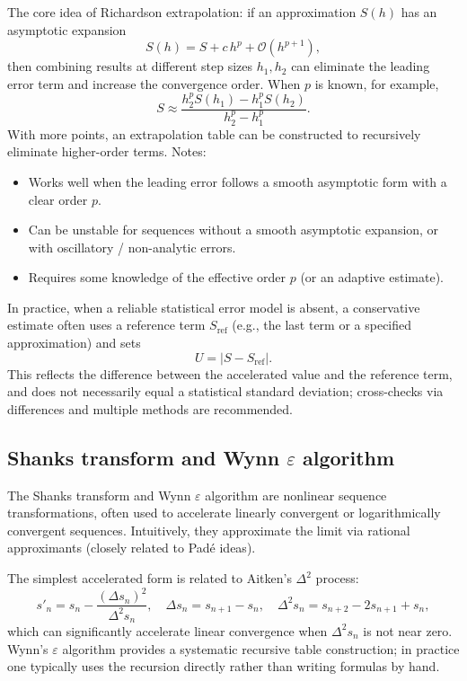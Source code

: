 \documentclass[a4paper,11pt]{article}
\begin{document}
The core idea of Richardson extrapolation: if an approximation $S(h)$ has an asymptotic expansion
\begin{equation}
S(h)=S + c\,h^p + \mathcal{O}(h^{p+1}),
\end{equation}
then combining results at different step sizes $h_1,h_2$ can eliminate the leading error term and increase the convergence order. When $p$ is known, for example,
\begin{equation}
S \approx \frac{h_2^p S(h_1) - h_1^p S(h_2)}{h_2^p - h_1^p}.
\end{equation}
With more points, an extrapolation table can be constructed to recursively eliminate higher-order terms. Notes:
\begin{itemize}
  \item Works well when the leading error follows a smooth asymptotic form with a clear order $p$.
  \item Can be unstable for sequences without a smooth asymptotic expansion, or with oscillatory / non-analytic errors.
  \item Requires some knowledge of the effective order $p$ (or an adaptive estimate).
\end{itemize}

In practice, when a reliable statistical error model is absent, a conservative estimate often uses a reference term $S_{\mathrm{ref}}$ (e.g., the last term or a specified approximation) and sets
\begin{equation}
U=|S-S_{\mathrm{ref}}|.
\end{equation}
This reflects the difference between the accelerated value and the reference term, and does not necessarily equal a statistical standard deviation; cross-checks via differences and multiple methods are recommended.

\subsection{Shanks transform and Wynn $\varepsilon$ algorithm}

The Shanks transform and Wynn $\varepsilon$ algorithm are nonlinear sequence transformations, often used to accelerate linearly convergent or logarithmically convergent sequences. Intuitively, they approximate the limit via rational approximants (closely related to Pad\'e ideas).

The simplest accelerated form is related to Aitken's $\Delta^2$ process:
\begin{equation}
s'_n = s_n - \frac{(\Delta s_n)^2}{\Delta^2 s_n},\quad
\Delta s_n=s_{n+1}-s_n,\quad
\Delta^2 s_n=s_{n+2}-2s_{n+1}+s_n,
\end{equation}
which can significantly accelerate linear convergence when $\Delta^2 s_n$ is not near zero. Wynn's $\varepsilon$ algorithm provides a systematic recursive table construction; in practice one typically uses the recursion directly rather than writing formulas by hand.
\end{document}
